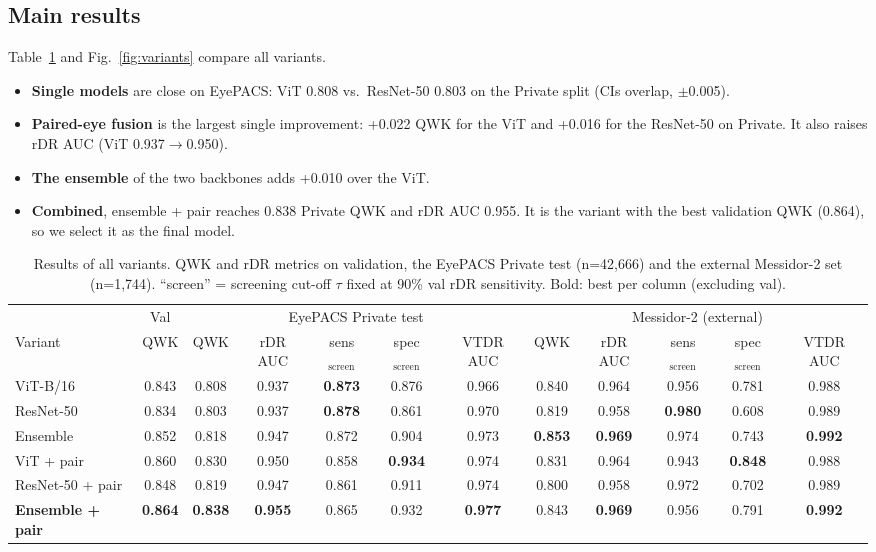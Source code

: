 \documentclass[conference,a4paper]{IEEEtran}
\begin{document}
\subsection{Main results}
Table~\ref{tab:main} and Fig.~\ref{fig:variants} compare all variants.
\begin{itemize}
\item \textbf{Single models} are close on EyePACS: ViT 0.808 vs.\ ResNet-50 0.803 on the Private split (CIs overlap, $\pm$0.005).
\item \textbf{Paired-eye fusion} is the largest single improvement: +0.022 QWK for the ViT and +0.016 for the ResNet-50 on Private. It also raises rDR AUC (ViT 0.937$\rightarrow$0.950).
\item \textbf{The ensemble} of the two backbones adds +0.010 over the ViT.
\item \textbf{Combined}, ensemble + pair reaches 0.838 Private QWK and rDR AUC 0.955. It is the variant with the best validation QWK (0.864), so we select it as the final model.
\end{itemize}

\begin{table}[t]
\centering
\caption{Results of all variants. QWK and rDR metrics on validation, the EyePACS Private test (n=42,666) and the external Messidor-2 set (n=1,744). ``screen'' = screening cut-off $\tau$ fixed at 90\% val rDR sensitivity. Bold: best per column (excluding val).}
\label{tab:main}
\footnotesize
\setlength{\tabcolsep}{4.2pt}
\begin{tabular}{@{}l c ccccc ccccc@{}}
\toprule
& Val & \multicolumn{5}{c}{EyePACS Private test} & \multicolumn{5}{c}{Messidor-2 (external)}\\
\cmidrule(lr){3-7}\cmidrule(lr){8-12}
Variant & QWK & QWK & rDR AUC & sens$_{\text{screen}}$ & spec$_{\text{screen}}$ & VTDR AUC & QWK & rDR AUC & sens$_{\text{screen}}$ & spec$_{\text{screen}}$ & VTDR AUC\\
\midrule
ViT-B/16 & 0.843 & 0.808 & 0.937 & \textbf{0.873} & 0.876 & 0.966 & 0.840 & 0.964 & 0.956 & 0.781 & 0.988\\
ResNet-50 & 0.834 & 0.803 & 0.937 & \textbf{0.878} & 0.861 & 0.970 & 0.819 & 0.958 & \textbf{0.980} & 0.608 & 0.989\\
Ensemble & 0.852 & 0.818 & 0.947 & 0.872 & 0.904 & 0.973 & \textbf{0.853} & \textbf{0.969} & 0.974 & 0.743 & \textbf{0.992}\\
ViT + pair & 0.860 & 0.830 & 0.950 & 0.858 & \textbf{0.934} & 0.974 & 0.831 & 0.964 & 0.943 & \textbf{0.848} & 0.988\\
ResNet-50 + pair & 0.848 & 0.819 & 0.947 & 0.861 & 0.911 & 0.974 & 0.800 & 0.958 & 0.972 & 0.702 & 0.989\\
\textbf{Ensemble + pair} & \textbf{0.864} & \textbf{0.838} & \textbf{0.955} & 0.865 & 0.932 & \textbf{0.977} & 0.843 & \textbf{0.969} & 0.956 & 0.791 & \textbf{0.992}\\
\bottomrule
\end{tabular}
\end{table}
\end{document}
